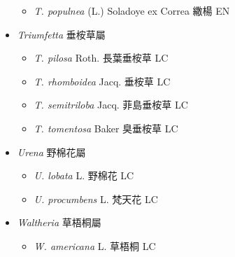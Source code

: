 \begin{itemize}
  \begin{itemize}
        \item[] \textit{T. populnea} (L.) Soladoye ex Correa  繖楊   EN
  \end{itemize}
 \item[] \textit{Triumfetta} 垂桉草屬
                                
  \begin{itemize}
        \item[] \textit{T. pilosa} Roth.  長葉垂桉草   LC
        \item[] \textit{T. rhomboidea} Jacq.  垂桉草   LC
        \item[] \textit{T. semitriloba} Jacq.  菲島垂桉草   LC
        \item[] \textit{T. tomentosa} Baker  臭垂桉草   LC
  \end{itemize}
 \item[] \textit{Urena} 野棉花屬
                                
  \begin{itemize}
        \item[] \textit{U. lobata} L.  野棉花   LC
        \item[] \textit{U. procumbens} L.  梵天花   LC
  \end{itemize}
 \item[] \textit{Waltheria} 草梧桐屬
                                
  \begin{itemize}
        \item[] \textit{W. americana} L.  草梧桐   LC
  \end{itemize}
  \end{itemize}
